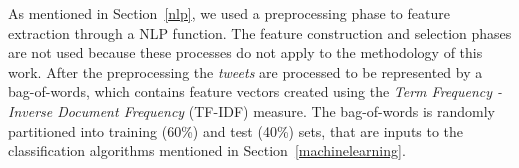 \documentclass[runningheads]{llncs}
\begin{document}
As mentioned in Section~\ref{nlp}, we used a preprocessing phase to feature extraction through a NLP function. The feature construction and selection phases are not used because these processes do not apply to the methodology of this work. After the preprocessing the \textit{tweets} are processed to be represented by a bag-of-words, which contains feature vectors created using the \textit{Term Frequency - Inverse Document Frequency} (TF-IDF) measure. The bag-of-words is randomly partitioned into training (60\%) and test (40\%) sets, that are inputs to the classification algorithms mentioned in Section~\ref{machinelearning}.





\end{document}
